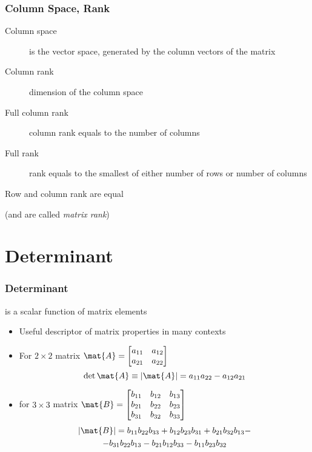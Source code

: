 \documentclass[mathserif, xcolor=table, svgnames]{beamer}
\begin{document}
\begin{frame}
  \frametitle{Column Space, Rank}
  \begin{description}
  \item[Column space] is the vector space, generated by the column
    vectors of the matrix
  \item[Column rank] dimension of the column space
  \item[Full column rank] column rank equals to the number of columns
  \item[Full rank] rank equals to the smallest of either number of
    rows or number of columns
  \end{description}
  \begin{theorem}
    Row and column rank are equal
  \end{theorem}
  (and are called \emph{matrix rank})
\end{frame}

\section{Determinant}

\begin{frame}
  \frametitle{Determinant}
  is a scalar function of matrix elements
  \begin{itemize}
  \item Useful descriptor of matrix properties in many contexts
  \end{itemize}
  \begin{itemize}
  \item For $2\times2$ matrix
    \begin{math}
      \mat{A} = 
      \begin{bmatrix}
        a_{11} & a_{12}\\
        a_{21} & a_{22}\\
      \end{bmatrix}
    \end{math}
    \begin{equation*}
      \det \mat{A} \equiv |\mat{A}|
      = a_{11} a_{22} - a_{12} a_{21}
    \end{equation*}
  \item for $3\times3$ matrix
    \begin{math}
      \mat{B} = 
      \begin{bmatrix}
        b_{11} & b_{12} & b_{13}\\
        b_{21} & b_{22} & b_{23}\\
        b_{31} & b_{32} & b_{33}\\
      \end{bmatrix}
    \end{math}
    \begin{multline*}
      |\mat{B}|
      = b_{11} b_{22} b_{33} + b_{12}b_{23}b_{31} + b_{21}b_{32}b_{13}
      -
      \\
      - b_{31}b_{22}b_{13} - b_{21}b_{12}b_{33} - b_{11}b_{23}b_{32}
    \end{multline*}
  \end{itemize}
\end{frame}
\end{document}
